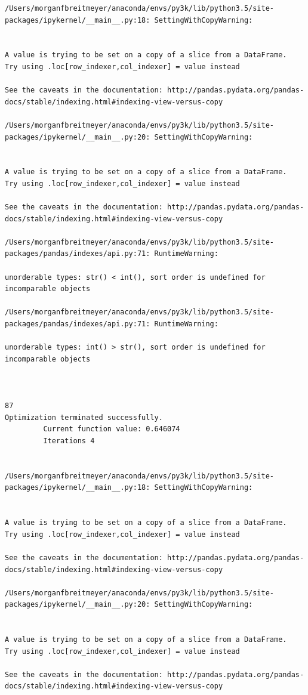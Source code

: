 \begin{lstlisting}
/Users/morganfbreitmeyer/anaconda/envs/py3k/lib/python3.5/site-packages/ipykernel/__main__.py:18: SettingWithCopyWarning:


A value is trying to be set on a copy of a slice from a DataFrame.
Try using .loc[row_indexer,col_indexer] = value instead

See the caveats in the documentation: http://pandas.pydata.org/pandas-docs/stable/indexing.html#indexing-view-versus-copy

/Users/morganfbreitmeyer/anaconda/envs/py3k/lib/python3.5/site-packages/ipykernel/__main__.py:20: SettingWithCopyWarning:


A value is trying to be set on a copy of a slice from a DataFrame.
Try using .loc[row_indexer,col_indexer] = value instead

See the caveats in the documentation: http://pandas.pydata.org/pandas-docs/stable/indexing.html#indexing-view-versus-copy

/Users/morganfbreitmeyer/anaconda/envs/py3k/lib/python3.5/site-packages/pandas/indexes/api.py:71: RuntimeWarning:

unorderable types: str() < int(), sort order is undefined for incomparable objects

/Users/morganfbreitmeyer/anaconda/envs/py3k/lib/python3.5/site-packages/pandas/indexes/api.py:71: RuntimeWarning:

unorderable types: int() > str(), sort order is undefined for incomparable objects



87
Optimization terminated successfully.
         Current function value: 0.646074
         Iterations 4


/Users/morganfbreitmeyer/anaconda/envs/py3k/lib/python3.5/site-packages/ipykernel/__main__.py:18: SettingWithCopyWarning:


A value is trying to be set on a copy of a slice from a DataFrame.
Try using .loc[row_indexer,col_indexer] = value instead

See the caveats in the documentation: http://pandas.pydata.org/pandas-docs/stable/indexing.html#indexing-view-versus-copy

/Users/morganfbreitmeyer/anaconda/envs/py3k/lib/python3.5/site-packages/ipykernel/__main__.py:20: SettingWithCopyWarning:


A value is trying to be set on a copy of a slice from a DataFrame.
Try using .loc[row_indexer,col_indexer] = value instead

See the caveats in the documentation: http://pandas.pydata.org/pandas-docs/stable/indexing.html#indexing-view-versus-copy


\end{lstlisting}
